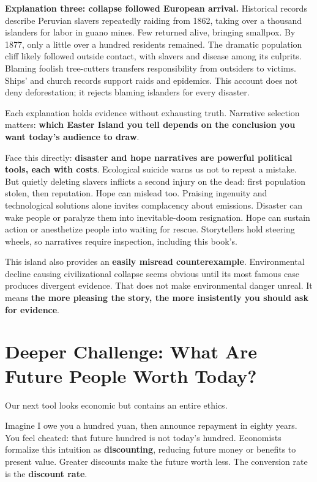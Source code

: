 \textbf{Explanation three: collapse followed European arrival.} Historical records describe Peruvian slavers repeatedly raiding from 1862, taking over a thousand islanders for labor in guano mines. Few returned alive, bringing smallpox. By 1877, only a little over a hundred residents remained. The dramatic population cliff likely followed outside contact, with slavers and disease among its culprits. Blaming foolish tree-cutters transfers responsibility from outsiders to victims. Ships' and church records support raids and epidemics. This account does not deny deforestation; it rejects blaming islanders for every disaster.

Each explanation holds evidence without exhausting truth. Narrative selection matters: \textbf{which Easter Island you tell depends on the conclusion you want today's audience to draw}.

Face this directly: \textbf{disaster and hope narratives are powerful political tools, each with costs}. Ecological suicide warns us not to repeat a mistake. But quietly deleting slavers inflicts a second injury on the dead: first population stolen, then reputation. Hope can mislead too. Praising ingenuity and technological solutions alone invites complacency about emissions. Disaster can wake people or paralyze them into inevitable-doom resignation. Hope can sustain action or anesthetize people into waiting for rescue. Storytellers hold steering wheels, so narratives require inspection, including this book's.

This island also provides an \textbf{easily misread counterexample}. Environmental decline causing civilizational collapse seems obvious until its most famous case produces divergent evidence. That does not make environmental danger unreal. It means \textbf{the more pleasing the story, the more insistently you should ask for evidence}.

\section[What Are Future People Worth Today?]{Deeper Challenge: What Are Future People Worth Today?}
Our next tool looks economic but contains an entire ethics.

Imagine I owe you a hundred yuan, then announce repayment in eighty years. You feel cheated: that future hundred is not today's hundred. Economists formalize this intuition as \textbf{discounting}, reducing future money or benefits to present value. Greater discounts make the future worth less. The conversion rate is the \textbf{discount rate}.

